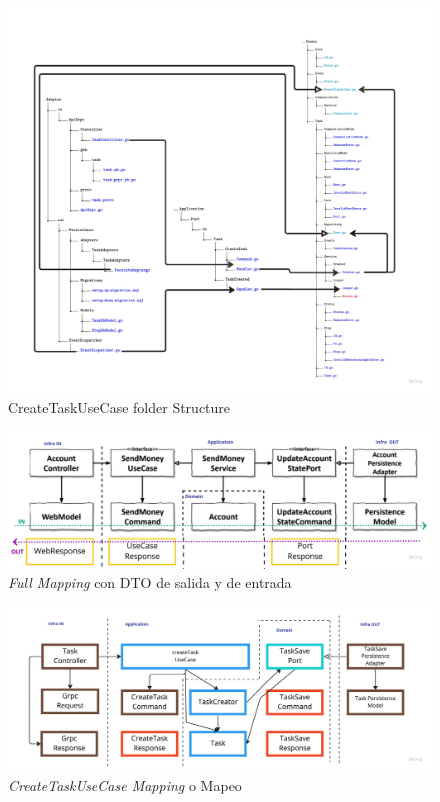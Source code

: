\begin{figure}[H]
    \centering
    \includegraphics[height=0.5\textheight]{./part/Ejecucion/Seguimiento/CreateTaskUseCase/img/PFM - CreateUseCaseFolderStructure}
    \caption{CreateTaskUseCase folder Structure}\label{fig:createTaskUseCaseArchitectureFolderStructure}
\end{figure}

\begin{figure}[H]
    \centering
    \includegraphics[height=0.2\textheight]{./part/Ejecucion/Seguimiento/CreateTaskUseCase/img/PFM - GetHandMapping}
    \caption{\textit{Full Mapping} con DTO de salida y de entrada\cite{TomHombergs2019GYHD}}\label{fig:GetHandMapping}
\end{figure}

\begin{figure}[H]
    \centering
    \includegraphics[height=0.2\textheight]{./part/Ejecucion/Seguimiento/CreateTaskUseCase/img/PFM - FinalMapping}
    \caption{\textit{CreateTaskUseCase Mapping} o Mapeo}\label{fig:CreateTaskUseCaseMapping}
\end{figure}

